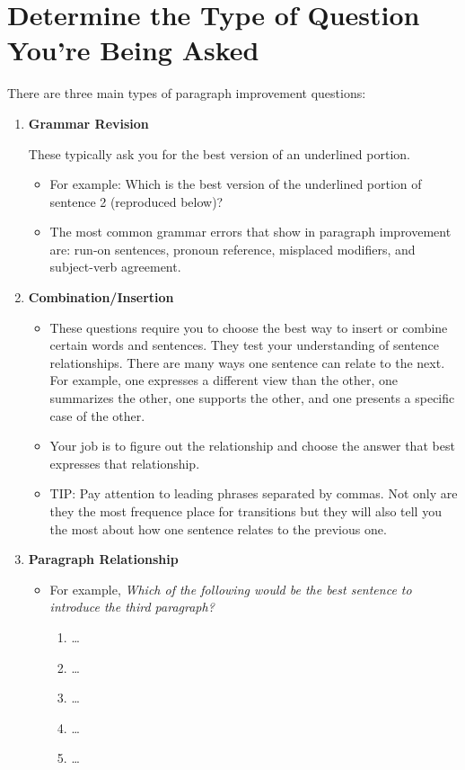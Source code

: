 \section{Determine the Type of Question You're Being Asked}

There are three main types of paragraph improvement questions:

\begin{enumerate}
\item{\large{\textbf{Grammar Revision}}}

These typically ask you for the best version of an underlined portion. 

\begin{itemize}
\item{For example: Which is the best version of the underlined portion of sentence 2 (reproduced below)?}

\item{The most common grammar errors that show in paragraph improvement are: run-on sentences, pronoun reference, misplaced modifiers, and subject-verb agreement.}
\end{itemize}

\item{\large{\textbf{Combination/Insertion}}}

\begin{itemize}
\item These questions require you to choose the best way to insert or combine certain words and sentences. They test your understanding of sentence relationships. There are many ways one sentence can relate to the next. For example, one expresses a different view than the other, one summarizes the other, one supports the other, and one presents a specific case of the other.


\item Your job is to figure out the relationship and choose the answer that best expresses that
relationship.

\item{TIP: Pay attention to leading phrases separated by commas. Not only are they the most frequence place for transitions but they will also tell you the most about how one sentence relates to the previous one.}
\end{itemize}

\item{\large{\textbf{Paragraph Relationship}}}

\begin{itemize}
\item{For example,}
\textit{Which of the following would be the best sentence to introduce the third paragraph?}

\begin{enumerate}[label=(\Alph*)]
\item\ldots
\item\ldots
\item\ldots
\item\ldots
\item\ldots
\end{enumerate}
\end{itemize}
\end{enumerate}

